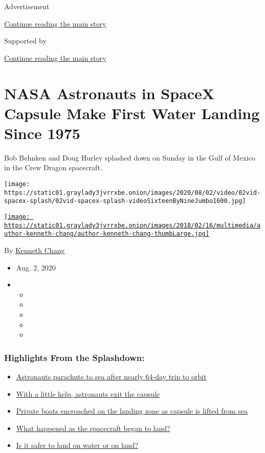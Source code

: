 Advertisement

\protect\hyperlink{after-top}{Continue reading the main story}

Supported by

\protect\hyperlink{after-sponsor}{Continue reading the main story}

\hypertarget{nasa-astronauts-in-spacex-capsule-make-first-water-landing-since-1975}{%
\section{NASA Astronauts in SpaceX Capsule Make First Water Landing
Since
1975}\label{nasa-astronauts-in-spacex-capsule-make-first-water-landing-since-1975}}

Bob Behnken and Doug Hurley splashed down on Sunday in the Gulf of
Mexico in the Crew Dragon spacecraft.

\texttt{[image: https://static01.graylady3jvrrxbe.onion/images/2020/08/02/video/02vid-spacex-splash/02vid-spacex-splash-videoSixteenByNineJumbo1600.jpg]}

\href{https://www.nytimes3xbfgragh.onion/by/kenneth-chang}{\texttt{[image: https://static01.graylady3jvrrxbe.onion/images/2018/02/16/multimedia/author-kenneth-chang/author-kenneth-chang-thumbLarge.jpg]}}

By \href{https://www.nytimes3xbfgragh.onion/by/kenneth-chang}{Kenneth
Chang}

\begin{itemize}
\item
  Aug. 2, 2020
\item
  \begin{itemize}
  \item
  \item
  \item
  \item
  \item
  \end{itemize}
\end{itemize}

\hypertarget{highlights-from-the-splashdown}{%
\subsubsection{Highlights From the
Splashdown:}\label{highlights-from-the-splashdown}}

\begin{itemize}
\tightlist
\item
  \protect\hyperlink{link-5f1ec4b9}{Astronauts parachute to sea after
  nearly 64-day trip to orbit}
\item
  \protect\hyperlink{link-1125e469}{With a little help, astronauts exit
  the capsule}
\item
  \protect\hyperlink{link-44b2cb75}{Private boats encroached on the
  landing zone as capsule is lifted from sea}
\item
  \protect\hyperlink{link-2ee20506}{What happened as the spacecraft
  began to land?}
\item
  \protect\hyperlink{link-3054d8}{Is it safer to land on water or on
  land?}
\end{itemize}

